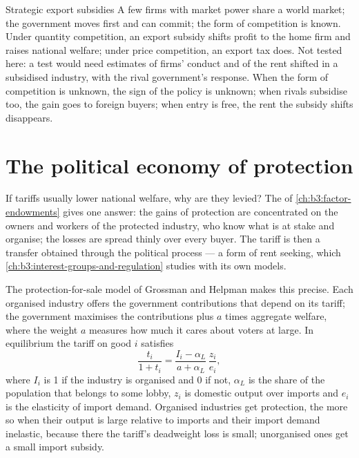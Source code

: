 \begin{model}{Strategic export subsidies}
\assumes A few firms with market power share a world market; the government
moves first and can commit; the form of competition is known.
\predicts Under quantity competition, an export subsidy shifts profit to the home
firm and raises national welfare; under price competition, an export tax does.
\tested Not tested here: a test would need estimates of firms' conduct and of the
rent shifted in a subsidised industry, with the rival government's response.
\breaks When the form of competition is unknown, the sign of the policy is
unknown; when rivals subsidise too, the gain goes to foreign buyers; when entry
is free, the rent the subsidy shifts disappears.
\end{model}

\section{The political economy of protection}\label{sec:b3:trade-policy:political}

If tariffs usually lower national welfare, why are they levied? The  of \cref{ch:b3:factor-endowments} gives one answer: the gains of protection
are concentrated on the owners and workers of the protected industry, who know
what is at stake and organise; the losses are spread thinly over every buyer. The
tariff is then a transfer obtained through the political process --- a form of rent
seeking, which \cref{ch:b3:interest-groups-and-regulation} studies with its own models.

The protection-for-sale model of Grossman and Helpman makes this precise. Each
organised industry offers the government contributions that depend on its tariff;
the government maximises the contributions plus $a$ times aggregate welfare, where
the weight $a$ measures how much it cares about voters at large. In equilibrium
the tariff on good $i$ satisfies
\begin{equation}\label{eq:b3:tp:pfs}
  \frac{t_i}{1 + t_i} = \frac{I_i - \alpha_L}{a + \alpha_L}\, \frac{z_i}{e_i},
\end{equation}
where $I_i$ is 1 if the industry is organised and 0 if not, $\alpha_L$ is the share
of the population that belongs to some lobby, $z_i$ is domestic output over imports
and $e_i$ is the elasticity of import demand. Organised industries get protection,
the more so when their output is large relative to imports and their import
demand inelastic, because there the tariff's deadweight loss is small; unorganised
ones get a small import subsidy.

